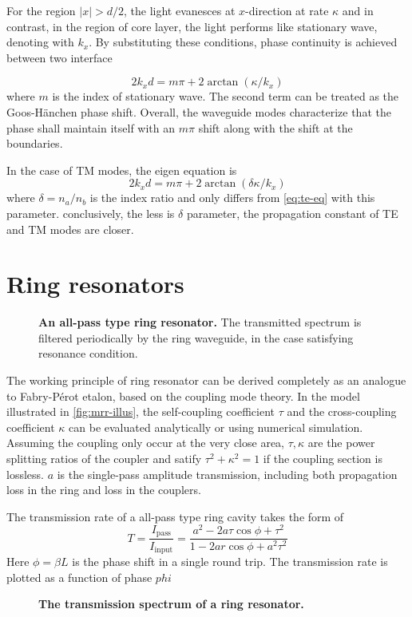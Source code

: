 \documentclass[final]{kuee_en}
\begin{document}
For the region $|x|>d/2$, the light evanesces at $x$-direction at rate $\kappa$ and in contrast, in the region of core layer, the light performs like stationary wave, denoting with $k_x$. By substituting these conditions, phase continuity is achieved between two interface

\begin{equation}\label{eq:te-eq}
    2k_x d = m\pi + 2\arctan(\kappa/k_x)
\end{equation}
where $m$ is the index of stationary wave. The second term can be treated as the Goos-H\"{a}nchen phase shift. Overall, the waveguide modes characterize that the phase shall maintain itself with an $m\pi$ shift along with the shift at the boundaries.

In the case of TM modes, the eigen equation is 
\begin{equation}
    2k_x d = m\pi + 2\arctan(\delta\kappa/k_x)
\end{equation}
where $\delta=n_a/n_b$ is the index ratio and only differs from \autoref{eq:te-eq} with this parameter. conclusively, the less is $\delta$ parameter, the propagation constant of TE and TM modes are closer.

\section{Ring resonators}

\begin{figure}
    \centering
	
	\caption{\textbf{An all-pass type ring resonator.} The transmitted spectrum is filtered periodically by the ring waveguide, in the case satisfying resonance condition.}
    \label{fig:mrr-illus}
\end{figure}

The working principle of ring resonator can be derived completely \cite{Bogaerts2012} as an analogue to Fabry-P\'{e}rot etalon, based on the coupling mode theory. In the model illustrated in \autoref{fig:mrr-illus}, the self-coupling coefficient $\tau$ and the cross-coupling coefficient $\kappa$ can be evaluated analytically or using numerical simulation. Assuming the coupling only occur at the very close area, $\tau,\kappa$ are the power splitting ratios of the coupler and satify $\tau^2 + \kappa^2 =1 $ if the coupling section is lossless. $a$ is the single-pass amplitude transmission, including both propagation loss in the ring and loss in the couplers.

The transmission rate of a all-pass type ring cavity takes the form of
\begin{equation}\label{eq:trans_phi}
    T = \frac{I_\mathrm{pass}}{I_\mathrm{input}} = \frac{a^2 - 2a\tau \cos \phi + \tau^2}{1 - 2ar \cos \phi + a^2 \tau^2}
\end{equation}
Here $\phi=\beta L$ is the phase shift in a single round trip. The transmission rate is plotted as a function of phase $phi$ 
\begin{figure}
    \centering
    
    \caption{\textbf{The transmission spectrum of a ring resonator.} }
    \label{fig:mrr_spec}
\end{figure}
\end{document}
